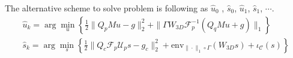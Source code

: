 \documentclass[preprint]{elsarticle}
\begin{document}
The alternative scheme to solve problem is following as $\hat{u}_0$ , $\hat{s}_0$, $\hat{u}_1$, $\hat{s}_1$, $\cdots$.
\begin{eqnarray*}
  \hat{u}_k=\arg\min_{u}\left\{ \frac{1}{2}\| Q_{p}Mu-g \|_{2}^{2}+\| \Gamma W_{3D}\mathcal{F}_p^{-1}(Q_{q}Mu+g)\| _{1}\right\} \\
  \hat{s}_k = \arg\min_{s}\left\{\frac{1}{2}\| Q_{c}\mathcal{F}_p \mathcal{U}_p s - g_c \|_{2}^{2}+\mathrm{env}_{\|\cdot\|_1\circ \Gamma} ( W_{3D}s)+\iota_\mathcal{C}(s) \right\}
\end{eqnarray*}
%
%
%
%
%
%
%
%
%
%
\end{document}
